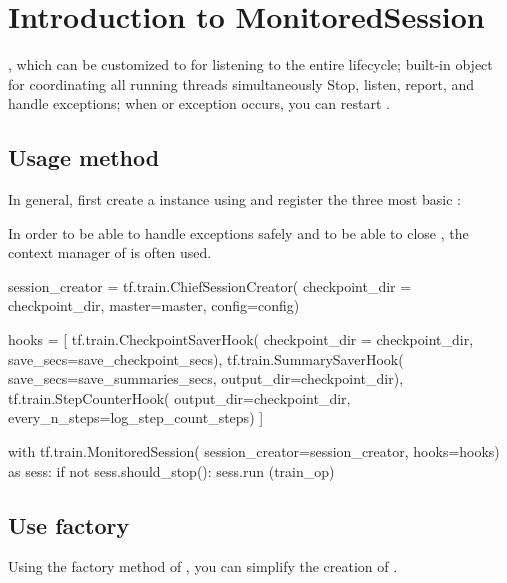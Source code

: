 \section{Introduction to MonitoredSession}
\begin{content}
, which can be customized to  for listening to the entire  lifecycle; built-in  object for coordinating all running threads simultaneously Stop, listen, report, and handle exceptions; when  or  exception occurs, you can restart .


\subsection{Usage method}
In general, first create a  instance using  and register the three most basic :

\begin{enum}
\end{enum}

In order to be able to handle exceptions safely and to be able to close , the context manager of  is often used.

\begin{leftbar}
\begin{python}
session_creator = tf.train.ChiefSessionCreator(
  checkpoint_dir = checkpoint_dir,
  master=master,
  config=config)

hooks = [
  tf.train.CheckpointSaverHook(
    checkpoint_dir = checkpoint_dir,
    save_secs=save_checkpoint_secs),
  tf.train.SummarySaverHook(
    save_secs=save_summaries_secs,
    output_dir=checkpoint_dir),
  tf.train.StepCounterHook(
    output_dir=checkpoint_dir, 
    every_n_steps=log_step_count_steps)
]

with tf.train.MonitoredSession(
  session_creator=session_creator,
  hooks=hooks) as sess:
  if not sess.should_stop():
    sess.run (train_op)
\end{python}
\end{leftbar}


\subsection{Use factory}
Using the factory method of , you can simplify the creation of .


\end{content}
